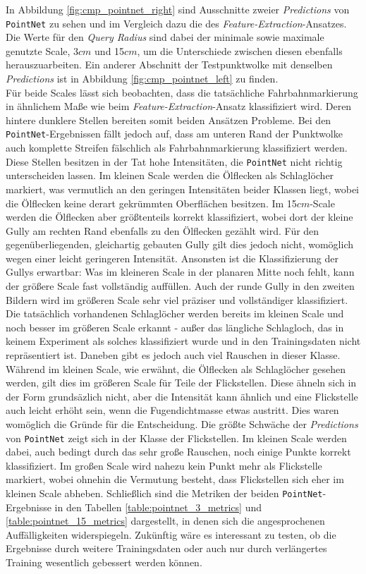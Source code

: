 In Abbildung \ref{fig:cmp_pointnet_right} sind Ausschnitte zweier \textit{Predictions} von \texttt{PointNet} zu sehen und im Vergleich dazu die des \textit{Feature-Extraction}-Ansatzes. Die Werte für den \textit{Query Radius} sind dabei der minimale sowie maximale genutzte Scale, 3$cm$ und 15$cm$, um die Unterschiede zwischen diesen ebenfalls herauszuarbeiten. Ein anderer Abschnitt der Testpunktwolke mit denselben \textit{Predictions} ist in Abbildung \ref{fig:cmp_pointnet_left} zu finden. \\
Für beide Scales lässt sich beobachten, dass die tatsächliche Fahrbahnmarkierung in ähnlichem Maße wie beim \textit{Feature-Extraction}-Ansatz klassifiziert wird. Deren hintere dunklere Stellen bereiten somit beiden Ansätzen Probleme. Bei den \texttt{PointNet}-Ergebnissen fällt jedoch auf, dass am unteren Rand der Punktwolke auch komplette Streifen fälschlich als Fahrbahnmarkierung klassifiziert werden. Diese Stellen besitzen in der Tat hohe Intensitäten, die \texttt{PointNet} nicht richtig unterscheiden lassen. Im kleinen Scale werden die Ölflecken als Schlaglöcher markiert, was vermutlich an den geringen Intensitäten beider Klassen liegt, wobei die Ölflecken keine derart gekrümmten Oberflächen besitzen. Im 15$cm$-Scale werden die Ölflecken aber größtenteils korrekt klassifiziert, wobei dort der kleine Gully am rechten Rand ebenfalls zu den Ölflecken gezählt wird. Für den gegenüberliegenden, gleichartig gebauten Gully gilt dies jedoch nicht, womöglich wegen einer leicht geringeren Intensität. Ansonsten ist die Klassifizierung der Gullys erwartbar: Was im kleineren Scale in der planaren Mitte noch fehlt, kann der größere Scale fast vollständig auffüllen. Auch der runde Gully in den zweiten Bildern wird im größeren Scale sehr viel präziser und vollständiger klassifiziert. \\
Die tatsächlich vorhandenen Schlaglöcher werden bereits im kleinen Scale und noch besser im größeren Scale erkannt - außer das längliche Schlagloch, das in keinem Experiment als solches klassifiziert wurde und in den Trainingsdaten nicht repräsentiert ist. Daneben gibt es jedoch auch viel Rauschen in dieser Klasse. Während im kleinen Scale, wie erwähnt, die Ölflecken als Schlaglöcher gesehen werden, gilt dies im größeren Scale für Teile der Flickstellen. Diese ähneln sich in der Form grundsäzlich nicht, aber die Intensität kann ähnlich und eine Flickstelle auch leicht erhöht sein, wenn die Fugendichtmasse etwas austritt. Dies waren womöglich die Gründe für die Entscheidung. Die größte Schwäche der \textit{Predictions} von \texttt{PointNet} zeigt sich in der Klasse der Flickstellen. Im kleinen Scale werden dabei, auch bedingt durch das sehr große Rauschen, noch einige Punkte korrekt klassifiziert. Im großen Scale wird nahezu kein Punkt mehr als Flickstelle markiert, wobei ohnehin die Vermutung besteht, dass Flickstellen sich eher im kleinen Scale abheben. 
Schließlich sind die Metriken der beiden \texttt{PointNet}-Ergebnisse in den Tabellen \ref{table:pointnet_3_metrics} und \ref{table:pointnet_15_metrics} dargestellt, in denen sich die angesprochenen Auffälligkeiten widerspiegeln. Zukünftig wäre es interessant zu testen, ob die Ergebnisse durch weitere Trainingsdaten oder auch nur durch verlängertes Training wesentlich gebessert werden können.


